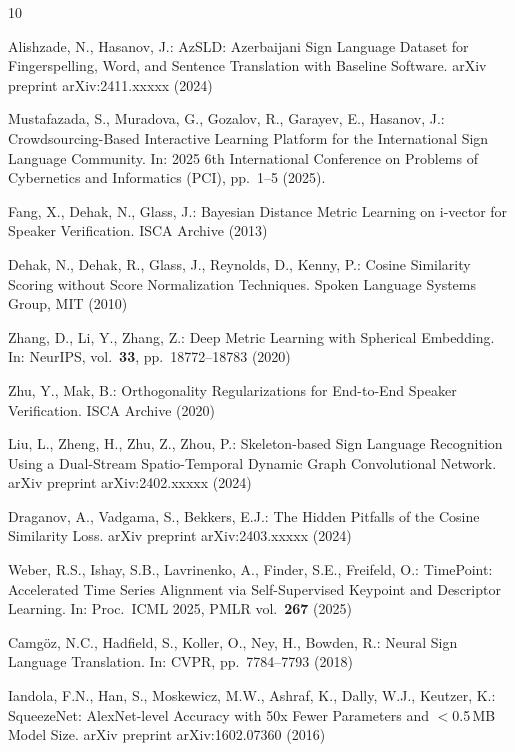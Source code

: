 \documentclass[runningheads]{llncs}
\begin{document}
%
% 
% 
%
\begin{thebibliography}{10}

Alishzade, N., Hasanov, J.:
AzSLD: Azerbaijani Sign Language Dataset for Fingerspelling, Word, and
Sentence Translation with Baseline Software.
arXiv preprint arXiv:2411.xxxxx (2024)

Mustafazada, S., Muradova, G., Gozalov, R., Garayev, E., Hasanov, J.:
Crowdsourcing-Based Interactive Learning Platform for the International
Sign Language Community.
In: 2025 6th International Conference on Problems of Cybernetics and
Informatics (PCI), pp.~1--5 (2025).

Fang, X., Dehak, N., Glass, J.:
Bayesian Distance Metric Learning on i-vector for Speaker Verification.
ISCA Archive (2013)

Dehak, N., Dehak, R., Glass, J., Reynolds, D., Kenny, P.:
Cosine Similarity Scoring without Score Normalization Techniques.
Spoken Language Systems Group, MIT (2010)

Zhang, D., Li, Y., Zhang, Z.:
Deep Metric Learning with Spherical Embedding.
In: NeurIPS, vol.~\textbf{33}, pp.~18772--18783 (2020)

Zhu, Y., Mak, B.:
Orthogonality Regularizations for End-to-End Speaker Verification.
ISCA Archive (2020)

Liu, L., Zheng, H., Zhu, Z., Zhou, P.:
Skeleton-based Sign Language Recognition Using a Dual-Stream
Spatio-Temporal Dynamic Graph Convolutional Network.
arXiv preprint arXiv:2402.xxxxx (2024)

Draganov, A., Vadgama, S., Bekkers, E.J.:
The Hidden Pitfalls of the Cosine Similarity Loss.
arXiv preprint arXiv:2403.xxxxx (2024)

Weber, R.S., Ishay, S.B., Lavrinenko, A., Finder, S.E., Freifeld, O.:
TimePoint: Accelerated Time Series Alignment via Self-Supervised Keypoint
and Descriptor Learning.
In: Proc.\ ICML 2025, PMLR vol.~\textbf{267} (2025)

Camg\"{o}z, N.C., Hadfield, S., Koller, O., Ney, H., Bowden, R.:
Neural Sign Language Translation.
In: CVPR, pp.~7784--7793 (2018)

Iandola, F.N., Han, S., Moskewicz, M.W., Ashraf, K., Dally, W.J.,
Keutzer, K.:
SqueezeNet: AlexNet-level Accuracy with 50x Fewer Parameters and
$<$0.5\,MB Model Size.
arXiv preprint arXiv:1602.07360 (2016)

\end{thebibliography}
\end{document}
